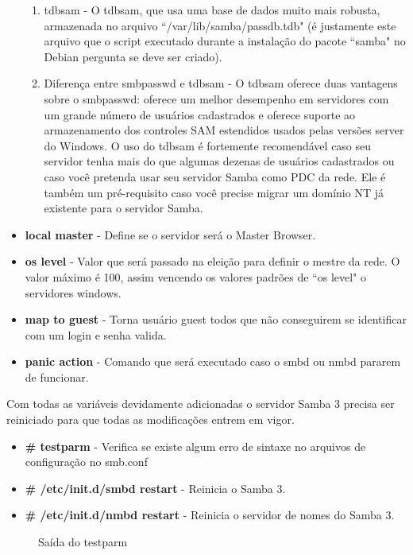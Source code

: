 \begin{itemize}
\begin{enumerate}
			\item{tdbsam} - O tdbsam, que usa uma base de dados muito mais robusta, armazenada no arquivo ``/var/lib/samba/passdb.tdb" (é justamente este arquivo que o script executado durante a instalação do pacote ``samba" no Debian pergunta se deve ser criado).\cite{BACKEND}
			\item{Diferença entre smbpasswd e tdbsam} - O tdbsam oferece duas vantagens sobre o smbpasswd: oferece um melhor desempenho em servidores com um grande número de usuários cadastrados e oferece suporte ao armazenamento dos controles SAM estendidos usados pelas versões server do Windows. O uso do tdbsam é fortemente recomendável caso seu servidor tenha mais do que algumas dezenas de usuários cadastrados ou caso você pretenda usar seu servidor Samba como PDC da rede. Ele é também um pré-requisito caso você precise migrar um domínio NT já existente para o servidor Samba. \cite{BACKEND}
		\end{enumerate}
	\item \textbf{local master} - Define se o servidor será o Master Browser.
	\item \textbf{os level} - Valor que será passado na eleição para definir o mestre da rede. O valor máximo é 100, assim vencendo os valores padrões de ``os level" o servidores windows.
	\item \textbf{map to guest} - Torna usuário guest todos que não conseguirem se identificar com um login e senha valida.
	\item \textbf{panic action} - Comando que será executado caso o smbd ou nmbd pararem de funcionar.
\end{itemize}

Com todas as variáveis devidamente adicionadas o servidor Samba 3 precisa ser reiniciado para que todas as modificações entrem em vigor.

\begin{itemize}
	\item \textbf{\# testparm} - Verifica se existe algum erro de sintaxe no arquivos de configuração no smb.conf
	\item \textbf{\# /etc/init.d/smbd restart} - Reinicia o Samba 3.
	\item \textbf{\# /etc/init.d/nmbd restart} - Reinicia o servidor de nomes do Samba 3.
\end{itemize}

\begin{figure}[ht]
   	\centering
   	\caption{Saída do testparm}
    \label{testparm}
\end{figure}

